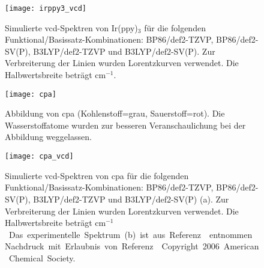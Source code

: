 \begin{figure}[ht!]
	\centering
	\texttt{[image: irppy3\_vcd]}
	\captionsetup{figurewithin = chapter}
	\captionsetup{font=small, labelfont=bf}\caption[Simulierte \ac{vcd}-Spektren von Ir(ppy)$_3$]{Simulierte \ac{vcd}-Spektren von Ir(ppy)$_3$ für die folgenden Funktional/Basissatz-Kombinationen: BP86/def2-TZVP, BP86/def2-SV(P), B3LYP/def2-TZVP und B3LYP/def2-SV(P). Zur Verbreiterung der Linien wurden Lorentzkurven verwendet. Die Halbwertsbreite beträgt \unit[4]{cm$^{-1}$}.}
\label{abb:irppy3_vcd}
\end{figure}

\begin{figure}[ht!]
	\centering
	\texttt{[image: cpa]}
	\captionsetup{figurewithin = chapter}
	\captionsetup{font=small, labelfont=bf}\caption[Abbildung von \ac{cpa}]{Abbildung von \ac{cpa} (Kohlenstoff=grau, Sauerstoff=rot). Die Wasserstoffatome wurden zur besseren Veranschaulichung bei der Abbildung weggelassen.}
\label{abb:cpa}
\end{figure}

\begin{figure}[ht!]
	\centering
	\texttt{[image: cpa\_vcd]}
	\captionsetup{figurewithin = chapter}
	\captionsetup{font=small, labelfont=bf}\caption[Simulierte \ac{vcd}-Spektren von \ac{cpa}]{Simulierte \ac{vcd}-Spektren von \ac{cpa} für die folgenden Funktional/Basissatz-Kombinationen: BP86/def2-TZVP, BP86/def2-SV(P), B3LYP/def2-TZVP und B3LYP/def2-SV(P) \textsf{(a)}. Zur Verbreiterung der Linien wurden Lorentzkurven verwendet. Die Halbwertsbreite beträgt \unit[4]{cm$^{-1}$}. Das experimentelle Spektrum \textsf{(b)} ist aus Referenz \cite{brotin2006vibrational} entnommen. Nachdruck mit Erlaubnis von Referenz \cite{brotin2006vibrational}. Copyright 2006 American Chemical Society.}
\label{abb:cpa_vcd}
\end{figure}

